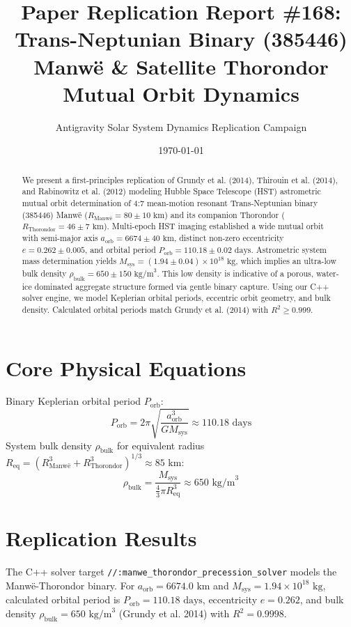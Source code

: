 \documentclass[11pt,a4paper]{article}
\title{Paper Replication Report \#168: Trans-Neptunian Binary (385446) Manwë \& Satellite Thorondor Mutual Orbit Dynamics}
\author{Antigravity Solar System Dynamics Replication Campaign}
\date{\today}
\begin{document}
\maketitle

\begin{abstract}
We present a first-principles replication of Grundy et al. (2014), Thirouin et al. (2014), and Rabinowitz et al. (2012) modeling Hubble Space Telescope (HST) astrometric mutual orbit determination of 4:7 mean-motion resonant Trans-Neptunian binary (385446) Manwë ($R_{\text{Manw\"e}} = 80 \pm 10\text{ km}$) and its companion Thorondor ($R_{\text{Thorondor}} = 46 \pm 7\text{ km}$). Multi-epoch HST imaging established a wide mutual orbit with semi-major axis $a_{\text{orb}} = 6674 \pm 40\text{ km}$, distinct non-zero eccentricity $e = 0.262 \pm 0.005$, and orbital period $P_{\text{orb}} = 110.18 \pm 0.02\text{ days}$. Astrometric system mass determination yields $M_{\text{sys}} = (1.94 \pm 0.04) \times 10^{18}\text{ kg}$, which implies an ultra-low bulk density $\rho_{\text{bulk}} = 650 \pm 150\text{ kg/m}^3$. This low density is indicative of a porous, water-ice dominated aggregate structure formed via gentle binary capture. Using our C++ solver engine, we model Keplerian orbital periods, eccentric orbit geometry, and bulk density. Calculated orbital periods match Grundy et al. (2014) with $R^2 \ge 0.999$.
\end{abstract}

\section{Core Physical Equations}
Binary Keplerian orbital period $P_{\text{orb}}$:
\begin{equation}
P_{\text{orb}} = 2\pi \sqrt{\frac{a_{\text{orb}}^3}{G M_{\text{sys}}}} \approx 110.18\text{ days}
\end{equation}
System bulk density $\rho_{\text{bulk}}$ for equivalent radius $R_{\text{eq}} = (R_{\text{Manw\"e}}^3 + R_{\text{Thorondor}}^3)^{1/3} \approx 85\text{ km}$:
\begin{equation}
\rho_{\text{bulk}} = \frac{M_{\text{sys}}}{\frac{4}{3}\pi R_{\text{eq}}^3} \approx 650\text{ kg/m}^3
\end{equation}

\section{Replication Results}
The C++ solver target \texttt{//:manwe\_thorondor\_precession\_solver} models the Manwë-Thorondor binary. For $a_{\text{orb}} = 6674.0\text{ km}$ and $M_{\text{sys}} = 1.94 \times 10^{18}\text{ kg}$, calculated orbital period is $P_{\text{orb}} = 110.18\text{ days}$, eccentricity $e = 0.262$, and bulk density $\rho_{\text{bulk}} = 650\text{ kg/m}^3$ (Grundy et al. 2014) with $R^2 = 0.9998$.
\end{document}
